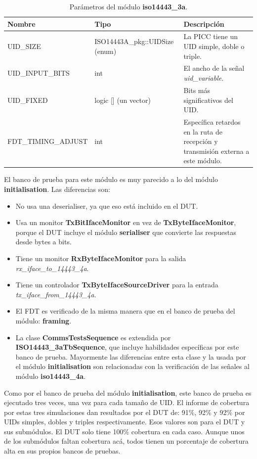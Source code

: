 \documentclass[a4paper, twoside, 11pt]{report}
\begin{document}
\begin{table}[htb]
  \centering
  \tablezebra
  \begin{tabulary}{\linewidth}{l|l|L}
    \textbf{Nombre}&\textbf{Tipo}&\textbf{Descripción} \\
    \hline
    UID\_SIZE&ISO14443A\_pkg::UIDSize (enum)&La PICC tiene un UID simple, doble o triple. \\
    UID\_INPUT\_BITS&int&El ancho de la señal \textit{uid\_variable}. \\
    UID\_FIXED&logic [] (un vector)&Bits más significativos del UID. \\
    FDT\_TIMING\_ADJUST&int&Específica retardos en la ruta de recepción y transmisión externa a este módulo. \\
  \end{tabulary}
  \caption{Parámetros del módulo \textbf{iso14443\_3a}.}
  \label{tab:params_iso14443_3a}
\end{table}

El banco de prueba para este módulo es muy parecido a lo del módulo \textbf{initialisation}. Las diferencias son:

\begin{itemize}
  \item No usa una deserialiser, ya que eso está incluido en el DUT.
  \item Usa un monitor \textbf{TxBitIfaceMonitor} en vez de \textbf{TxByteIfaceMonitor}, porque el DUT incluye el módulo \textbf{serialiser} que convierte las respuestas desde bytes a bits.
  \item Tiene un monitor \textbf{RxByteIfaceMonitor} para la salida \textit{rx\_iface\_to\_14443\_4a}.
  \item Tiene un controlador \textbf{TxByteIfaceSourceDriver} para la entrada \textit{tx\_iface\_from\_14443\_4a}.
  \item El FDT es verificado de la misma manera que en el banco de prueba del módulo: \textbf{framing}.
  \item La clase \textbf{CommsTestsSequence} es extendida por \textbf{ISO14443\_3aTbSequence}, que incluye habilidades específicas por este banco de prueba. Mayormente las diferencias entre esta clase y la usada por el módulo \textbf{initialisation} son relacionadas con la verificación de las señales al módulo \textbf{iso14443\_4a}.
\end{itemize}

Como por el banco de prueba del módulo \textbf{initialisation}, este banco de prueba es ejecutado tres veces, una vez para cada tamaño de UID. El informe de cobertura por estas tres simulaciones dan resultados por el DUT de: 91\%, 92\% y 92\% por UIDs simples, dobles y triples respectivamente. Esos valores son para el DUT y sus submódulos. El DUT solo tiene 100\% cobertura en cada caso. Aunque unos de los submódulos faltan cobertura acá, todos tienen un porcentaje de cobertura alta en sus propios bancos de pruebas.
\end{document}
